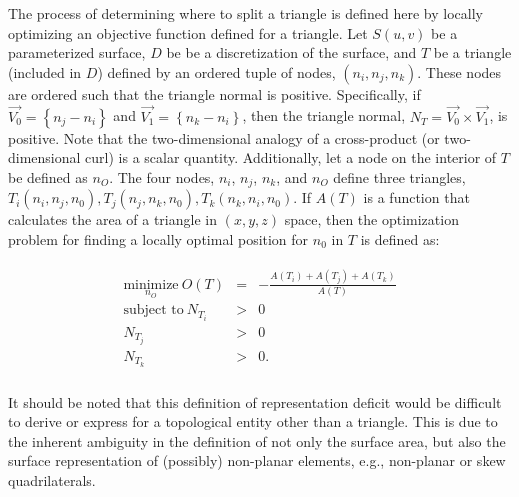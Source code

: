 The process of determining where to split a triangle is defined here by
locally optimizing an objective function defined for a triangle.  Let
$S(u,v)$ be a parameterized surface, $D$ be be a discretization of the
surface, and $T$ be a triangle (included in $D$) defined by an ordered
tuple of nodes, $\left(n_i, n_j, n_k\right)$. These nodes are ordered
such that the triangle normal is positive. Specifically, if $\vec{V_0} =
\left\{n_j - n_i \right\}$ and $\vec{V_1} = \left\{n_k - n_i\right\}$, 
then the triangle normal, $N_T = \vec{V_0} \times \vec{V_1}$, is
positive. Note that the two-dimensional analogy of a cross-product (or 
two-dimensional curl) is a scalar quantity. Additionally, let a node on 
the interior of $T$ be defined as $n_O$. The four nodes, $n_i$, $n_j$, 
$n_k$, and $n_O$
define three triangles, $T_i\left(n_i,n_j,n_0\right), T_j\left(n_j, n_k,
n_0\right), T_k\left(n_k, n_i, n_0\right)$. If $A(T)$ is a function
that calculates the area of a triangle in $\left(x,y,z\right)$ space,
then the optimization problem for finding a locally optimal position for 
$n_0$ in $T$ is defined as:

\begin{eqnarray*}
\begin{array}{rcl}
\underset{n_O}{\text{minimize}} \ O(T) & = & - \frac{A\left(T_i\right) + A\left(T_j\right) + A\left(T_k\right) }{ A\left(T\right) }\\
\text{subject to} \ N_{T_i} & > & 0 \\
N_{T_j} & > & 0 \\ 
N_{T_k} & > & 0. \\
\end{array}
\end{eqnarray*}

It should be noted that this definition of representation deficit would
be difficult to derive or express for a topological entity other than a
triangle. This is due to the inherent ambiguity in the definition of not
only the surface area, but also the surface representation of (possibly)
non-planar elements, e.g., non-planar or skew quadrilaterals.

